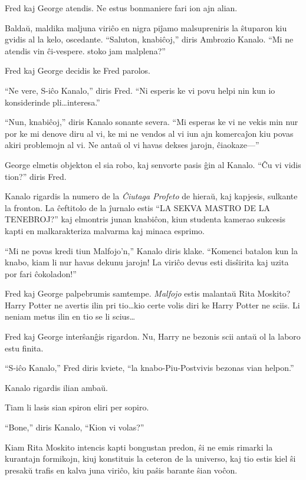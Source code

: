 Fred kaj George atendis. Ne estus bonmaniere fari ion ajn alian.

Baldaŭ, maldika maljuna viriĉo en nigra piĵamo malsupreniris la
ŝtuparon kiu gvidis al la kelo, oscedante. ``Saluton, knabiĉoj,''
diris Ambrozio Kanalo. ``Mi ne atendis vin ĉi-vespere. stoko jam
malplena?''

Fred kaj George decidis ke Fred parolos.

``Ne vere, S-iĉo Kanalo,'' diris Fred. ``Ni esperis ke vi povu helpi
nin kun io konsiderinde pli\ldots{}interesa.''

``Nun, knabiĉoj,'' diris Kanalo sonante severa. ``Mi esperas ke vi ne
vekis min nur por ke mi denove diru al vi, ke mi ne vendos al vi iun
ajn komercaĵon kiu povas akiri problemojn al vi. Ne antaŭ ol vi havas
dekses jarojn, ĉiaokaze—''

George elmetis objekton el sia robo, kaj senvorte pasis ĝin al
Kanalo. ``Ĉu vi vidis tion?'' diris Fred.

Kanalo rigardis la numero de la \emph{Ĉiutaga Profeto} de hieraŭ, kaj
kapjesis, sulkante la fronton. La ĉeftitolo de la ĵurnalo estis ``LA
SEKVA MASTRO DE LA TENEBROJ?'' kaj elmontris junan knabiĉon, kiun
studenta kamerao sukcesis kapti en malkarakteriza malvarma kaj minaca
esprimo.

``Mi ne povas kredi tiun Malfojo'n,'' Kanalo diris klake. ``Komenci
batalon kun la knabo, kiam li nur havas dekunu jarojn! La viriĉo devus
esti disŝirita kaj uzita por fari ĉokoladon!''

Fred kaj George palpebrumis samtempe. \emph{Malfojo} estis malantaŭ
Rita Moskito? Harry Potter ne avertis ilin pri tio\ldots{}kio certe
volis diri ke Harry Potter ne sciis. Li neniam metus ilin en tio se li
scius\ldots{}

Fred kaj George interŝanĝis rigardon. Nu, Harry ne bezonis scii antaŭ
ol la laboro estu finita.

``S-iĉo Kanalo,'' Fred diris kviete, ``la knabo-Piu-Postvivis bezonas
vian helpon.''

Kanalo rigardis ilian ambaŭ.

Tiam li lasis sian spiron eliri per sopiro.

``Bone,'' diris Kanalo, ``Kion vi volas?''


Kiam Rita Moskito intencis kapti bongustan predon, ŝi ne emis rimarki
la kurantajn formikojn, kiuj konstituis la ceteron de la universo, kaj
tio estis kiel ŝi presakŭ trafis en kalva juna viriĉo, kiu paŝis
barante ŝian voĉon.

